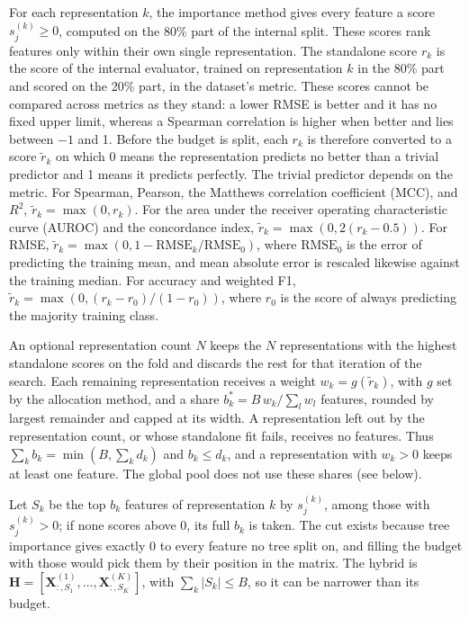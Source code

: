 For each representation $k$, the importance method gives every feature a score $s^{(k)}_j \ge 0$, computed on the 80\% part of the internal split. These scores rank features only within their own single representation. The standalone score $r_k$ is the score of the internal evaluator, trained on representation $k$ in the 80\% part and scored on the 20\% part, in the dataset's metric. These scores cannot be compared across metrics as they stand: a lower RMSE is better and it has no fixed upper limit, whereas a Spearman correlation is higher when better and lies between $-1$ and 1. Before the budget is split, each $r_k$ is therefore converted to a score $\tilde r_k$ on which 0 means the representation predicts no better than a trivial predictor and 1 means it predicts perfectly. The trivial predictor depends on the metric. For Spearman, Pearson, the Matthews correlation coefficient (MCC), and $R^2$, $\tilde r_k = \max(0, r_k)$. For the area under the receiver operating characteristic curve (AUROC) and the concordance index, $\tilde r_k = \max(0, 2(r_k - 0.5))$. For RMSE, $\tilde r_k = \max(0, 1 - \mathrm{RMSE}_k/\mathrm{RMSE}_0)$, where $\mathrm{RMSE}_0$ is the error of predicting the training mean, and mean absolute error is rescaled likewise against the training median. For accuracy and weighted F1, $\tilde r_k = \max(0, (r_k - r_0)/(1 - r_0))$, where $r_0$ is the score of always predicting the majority training class.

An optional representation count $N$ keeps the $N$ representations with the highest standalone scores on the fold and discards the rest for that iteration of the search. Each remaining representation receives a weight $w_k = g(\tilde r_k)$, with $g$ set by the allocation method, and a share $b^*_k = B\, w_k / \sum_l w_l$ features, rounded by largest remainder and capped at its width. A representation left out by the representation count, or whose standalone fit fails, receives no features. Thus $\sum_k b_k = \min(B, \sum_k d_k)$ and $b_k \le d_k$, and a representation with $w_k > 0$ keeps at least one feature. The global pool does not use these shares (see below).

Let $S_k$ be the top $b_k$ features of representation $k$ by $s^{(k)}_j$, among those with $s^{(k)}_j > 0$; if none scores above 0, its full $b_k$ is taken. The cut exists because tree importance gives exactly 0 to every feature no tree split on, and filling the budget with those would pick them by their position in the matrix. The hybrid is $\mathbf{H} = [\mathbf{X}^{(1)}_{:,S_1}, \dots, \mathbf{X}^{(K)}_{:,S_K}]$, with $\sum_k |S_k| \le B$, so it can be narrower than its budget.

